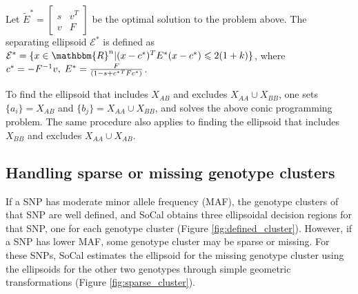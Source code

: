 \documentclass{scrartcl}
\begin{document}
\par
Let 
$\tilde{E}^{*}=\left[
    \begin{array}{cc}
    s & v^T \\
    v & F
    \end{array}
\right]$
be the optimal solution to the problem above.
The separating ellipsoid $\mathcal{E}^{*}$ is defined as
$\mathcal{E}^{*}=
\{x \in \mathbbm{R}^{n}|(x-c^{*})^TE^{*}(x-c^{*})\leqslant2(1+k)\}$,
where $c^{*}=-F^{-1}v,\;E^{*}={{F} \over {(1-s+{c^{*}}^TF{c^{*}})}}$.

\par
To find the ellipsoid that includes $X_{AB}$ and excludes
$X_{AA} \cup X_{BB}$, one sets $\{a_i\}=X_{AB}$ and
$\{b_j\}=X_{AA} \cup X_{BB}$, and solves the above conic programming problem.
The same procedure also applies to finding the ellipsoid that includes $X_{BB}$
and excludes $X_{AA} \cup X_{AB}$.

\subsection{Handling sparse or missing genotype clusters}
\par
If a SNP has moderate minor allele frequency (MAF), the genotype clusters of
that SNP are well defined, and SoCal obtains three ellipsoidal decision
regions for that SNP, one for each genotype cluster
(Figure \ref{fig:defined_cluster}).
However, if a SNP has lower MAF, some genotype cluster may be sparse
or missing.
For these SNPs, SoCal estimates the ellipsoid for the missing genotype cluster
using the ellipsoids for the other two genotypes through simple geometric
transformations (Figure \ref{fig:sparse_cluster}).
\end{document}
